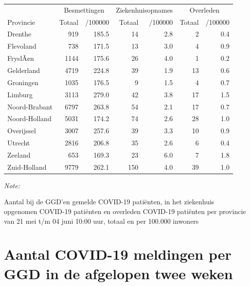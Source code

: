 \documentclass[
  english,
  man,floatsintext]{apa6}
\begin{document}
\begin{table}
\centering
\begin{threeparttable}
\begin{tabular}{lrrrrrr}
\toprule
\multicolumn{1}{c}{ } & \multicolumn{2}{c}{Besmettingen} & \multicolumn{2}{c}{Ziekenhuisopnames} & \multicolumn{2}{c}{Overleden} \\
\cmidrule(l{3pt}r{3pt}){2-3} \cmidrule(l{3pt}r{3pt}){4-5} \cmidrule(l{3pt}r{3pt}){6-7}
Provincie & Totaal & /100000 & Totaal & /100000 & Totaal & /100000\\
\midrule
Drenthe & 919 & 185.5 & 14 & 2.8 & 2 & 0.4\\
Flevoland & 738 & 171.5 & 13 & 3.0 & 4 & 0.9\\
FryslÃ¢n & 1144 & 175.6 & 26 & 4.0 & 1 & 0.2\\
Gelderland & 4719 & 224.8 & 39 & 1.9 & 13 & 0.6\\
Groningen & 1035 & 176.5 & 9 & 1.5 & 4 & 0.7\\
Limburg & 3113 & 279.0 & 42 & 3.8 & 17 & 1.5\\
Noord-Brabant & 6797 & 263.8 & 54 & 2.1 & 17 & 0.7\\
Noord-Holland & 5031 & 174.2 & 74 & 2.6 & 28 & 1.0\\
Overijssel & 3007 & 257.6 & 39 & 3.3 & 10 & 0.9\\
Utrecht & 2816 & 206.8 & 35 & 2.6 & 6 & 0.4\\
Zeeland & 653 & 169.3 & 23 & 6.0 & 7 & 1.8\\
Zuid-Holland & 9779 & 262.1 & 150 & 4.0 & 39 & 1.0\\
\bottomrule
\end{tabular}
\begin{tablenotes}
\item \textit{Note: } 
\item Aantal bij de GGD’en gemelde COVID-19 patiënten, in het ziekenhuis opgenomen COVID-19 patiënten en overleden COVID-19 patiënten per provincie van 21 mei t/m 04 juni 10:00 uur, totaal en per 100.000 inwoners
\end{tablenotes}
\end{threeparttable}
\end{table}

\newpage

\hypertarget{aantal-covid-19-meldingen-per-ggd-in-de-afgelopen-twee-weken}{%
\section{Aantal COVID-19 meldingen per GGD in de afgelopen twee weken}\label{aantal-covid-19-meldingen-per-ggd-in-de-afgelopen-twee-weken}}
\end{document}
